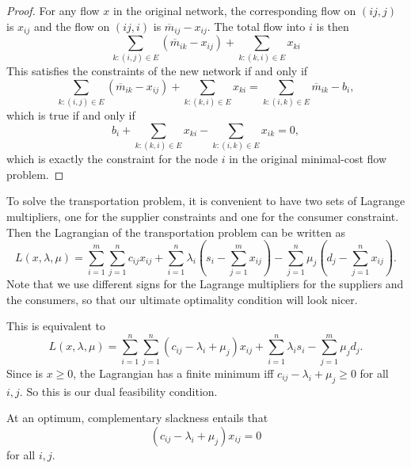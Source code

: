 \documentclass[a4paper]{article}
\begin{document}
\begin{proof}
  For any flow $x$ in the original network, the corresponding flow on $(ij, j)$ is $x_{ij}$ and the flow on $(ij, i)$ is $\overline{m}_{ij} - x_{ij}$.  The total flow into $i$ is then
  \[
   \sum_{k: (i, j)\in E}(\overline{m}_{ik} - x_{ij}) + \sum_{k: (k, i)\in E}x_{ki}
  \]
  This satisfies the constraints of the new network if and only if
  \[
   \sum_{k: (i, j)\in E}(\overline{m}_{ik} - x_{ij}) + \sum_{k: (k, i)\in E}x_{ki} = \sum_{k: (i, k)\in E}\overline{m}_{ik} - b_i,
  \]
  which is true if and only if
  \[
    b_i + \sum_{k:(k, i)\in E}x_{ki} - \sum_{k: (i, k)\in E}x_{ik} = 0,
  \]
  which is exactly the constraint for the node $i$ in the original minimal-cost flow problem.
\end{proof}
To solve the transportation problem, it is convenient to have two sets of Lagrange multipliers, one for the supplier constraints and one for the consumer constraint. Then the Lagrangian of the transportation problem can be written as
\[
  L(x, \lambda, \mu) = \sum_{i = 1}^m\sum_{j = 1}^n c_{ij}x_{ij} + \sum_{i = 1}^n \lambda_i\left(s_i - \sum_{j = 1}^m x_{ij}\right) - \sum_{j = 1}^n \mu_j\left(d_j - \sum_{j = 1}^n x_{ij}\right).
\]
Note that we use different signs for the Lagrange multipliers for the suppliers and the consumers, so that our ultimate optimality condition will look nicer.

This is equivalent to
\[
  L(x, \lambda, \mu) = \sum_{i = 1}^n \sum_{j = 1}^n (c_{ij} - \lambda_i + \mu_j)x_{ij} + \sum_{i = 1}^n \lambda_i s_i - \sum_{j = 1}^m \mu_j d_j.
\]
Since is $x \geq 0$, the Lagrangian has a finite minimum iff $c_{ij} - \lambda_i + \mu_j \geq 0$ for all $i, j$. So this is our dual feasibility condition.

At an optimum, complementary slackness entails that
\[
  (c_{ij} - \lambda_i + \mu_j)x_{ij} = 0
\]
for all $i, j$.
\end{document}
